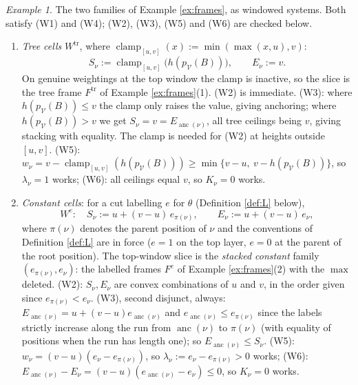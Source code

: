 \documentclass[12pt]{amsart}
\theoremstyle{definition}
\theoremstyle{remark}
\newtheorem{example}[subsection]{Example}
\newcommand{\Cal}[1]{\mathcal{#1}}
\newcommand{\anc}{\operatorname{anc}}            %
\begin{document}
\begin{example}\label{ex:Wcells}
The two families of Example \ref{ex:frames}, as windowed systems. Both satisfy (W1) and (W4); (W2), (W3), (W5) and (W6) are checked below.
\begin{enumerate}[label=(\arabic*)]
    \item \emph{Tree cells} $W^{\mathrm{tr}}$, where $\operatorname{clamp}_{[u,v]}(x) := \min(\max(x, u), v)$:
    \[ S_\nu := \operatorname{clamp}_{[u,v]}\big(h(p_{\Cal{V}}(B))\big), \quad\quad E_\nu := v.\]
    On genuine weightings at the top window the clamp is inactive, so the slice is the tree frame $F^{\mathrm{tr}}$ of Example \ref{ex:frames}(1). (W2) is immediate. (W3): where $h(p_{\Cal{V}}(B))\leq v$ the clamp only raises the value, giving anchoring; where $h(p_{\Cal{V}}(B)) > v$ we get $S_\nu = v = E_{\anc(\nu)}$, all tree ceilings being $v$, giving stacking with equality. The clamp is needed for (W2) at heights outside $[u,v]$. (W5): $w_\nu = v - \operatorname{clamp}_{[u,v]}(h(p_{\Cal{V}}(B))) \geq \min\{v-u,\ v - h(p_{\Cal{V}}(B))\}$, so $\lambda_\nu = 1$ works; (W6): all ceilings equal $v$, so $K_\nu = 0$ works.
    \item \emph{Constant cells}: for a cut labelling $e$ for $\theta$ (Definition \ref{def:L} below),
    \[ W^{e}\colon \quad S_\nu := u + (v-u)\, e_{\pi(\nu)}, \quad\quad E_\nu := u + (v-u)\, e_{\nu},\]
    where $\pi(\nu)$ denotes the parent position of $\nu$ and the conventions of Definition \ref{def:L} are in force ($e = 1$ on the top layer, $e = 0$ at the parent of the root position). The top-window slice is the \emph{stacked constant} family $(e_{\pi(\nu)}, e_\nu)$: the labelled frames $F^{e}$ of Example \ref{ex:frames}(2) with the $\max$ deleted. (W2): $S_\nu, E_\nu$ are convex combinations of $u$ and $v$, in the order given since $e_{\pi(\nu)} < e_{\nu}$. (W3), second disjunct, always: $E_{\anc(\nu)} = u + (v-u)e_{\anc(\nu)}$ and $e_{\anc(\nu)}\leq e_{\pi(\nu)}$ since the labels strictly increase along the run from $\anc(\nu)$ to $\pi(\nu)$ (with equality of positions when the run has length one); so $E_{\anc(\nu)}\leq S_\nu$. (W5): $w_\nu = (v-u)(e_\nu - e_{\pi(\nu)})$, so $\lambda_\nu := e_\nu - e_{\pi(\nu)} > 0$ works; (W6): $E_{\anc(\nu)} - E_\nu = (v-u)(e_{\anc(\nu)} - e_\nu) \leq 0$, so $K_\nu = 0$ works.
\end{enumerate}
\end{example}
\end{document}

